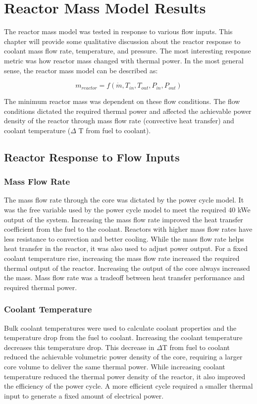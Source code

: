 \chapter{Reactor Mass Model Results}\label{ch:power_cycle_results}
The reactor mass model was tested in response to various flow inputs. This
chapter will provide some qualitative discussion about the reactor response to
coolant mass flow rate, temperature, and pressure. The most interesting response
metric was how reactor mass changed with thermal power.
In the most general sense, the reactor mass model can be described as:

\begin{equation}
    m_{reactor} = f(\dot{m}, T_{in}, T_{out}, P_{in}, P_{out})
\end{equation}

The minimum reactor mass was dependent on these flow conditions. The flow
conditions dictated the required thermal power and affected the achievable power
density of the reactor through mass flow rate (convective heat transfer) and
coolant temperature ($\Delta$ T from fuel to coolant).

\section{Reactor Response to Flow Inputs}

\subsection{Mass Flow Rate}
The mass flow rate through the core was dictated by the power cycle model. It was
the free variable used by the power cycle model to meet the required 40 kWe
output of the system. Increasing the mass flow rate improved the heat transfer
coefficient from the fuel to the coolant. Reactors with higher mass flow rates
have less resistance to convection and better cooling. While the mass flow rate
helps heat transfer in the reactor, it was also used to adjust power output. For
a fixed coolant temperature rise, increasing the mass flow rate increased the
required thermal output of the reactor. Increasing the output of the core always
increased the mass. Mass flow rate was a tradeoff between heat transfer
performance and required thermal power.

\subsection{Coolant Temperature}
Bulk coolant temperatures were used to calculate coolant properties and the
temperature drop from the fuel to coolant. Increasing the coolant temperature
decreases this temperature drop. This decrease in $\Delta$T from fuel to coolant
reduced the
achievable volumetric power density of the core, requiring a larger core volume to deliver the same
thermal power. While increasing coolant temperature reduced the thermal power
density of the reactor, it also improved the efficiency of the power cycle. A
more efficient cycle required a smaller thermal input to generate a fixed amount
of electrical power.

